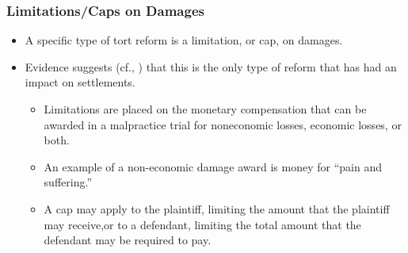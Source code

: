 \documentclass[serif,10pt]{beamer}
\begin{document}
\begin{frame}
\frametitle{Limitations/Caps on Damages}

 \begin{itemize}
\item A specific type of tort reform is a limitation, or cap, on damages.
\item Evidence suggests (cf., \cite{kachalia2011new}) that this is the only type of reform that has had an impact on settlements.
  \begin{itemize}
\item Limitations are placed on the monetary compensation that can be awarded in a malpractice trial for noneconomic losses, economic losses,  or both.
\item An example of a non-economic damage award is money for ``pain and suffering.''
\item A cap may apply to the plaintiff, limiting the amount that the plaintiff may receive,or to a defendant, limiting the total amount that the defendant may be required to pay.
\end{itemize}
\end{itemize}
\end{frame}
\end{document}
